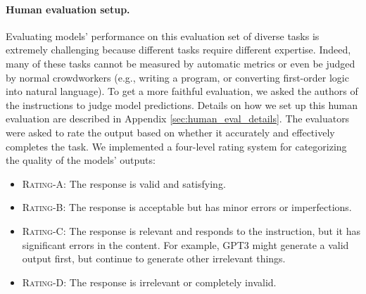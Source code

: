 \paragraph{Human evaluation setup.} Evaluating models' performance on this evaluation set of diverse tasks is extremely challenging because different tasks require different expertise. Indeed, many of these tasks cannot be measured by automatic metrics or even be judged by normal crowdworkers (e.g., writing a program, or converting first-order logic into natural language). To get a more faithful evaluation, we asked the authors of the instructions to judge model predictions. Details on how we set up this human evaluation are described in Appendix \ref{sec:human_eval_details}. The evaluators were asked to rate the output based on whether it accurately and effectively completes the task. We implemented a four-level rating system for categorizing the quality of the models' outputs:

\begin{itemize}[noitemsep, leftmargin=*]
    \item \textsc{Rating-A:} The response is valid and satisfying.
    \item \textsc{Rating-B:} The response is acceptable but has minor errors or imperfections.
    \item \textsc{Rating-C:} The response is relevant and responds to the instruction, but it has significant errors in the content. For example, GPT3 might generate a valid output first, but continue to generate other irrelevant things.
    \item \textsc{Rating-D:} The response is irrelevant or completely invalid.
\end{itemize}

